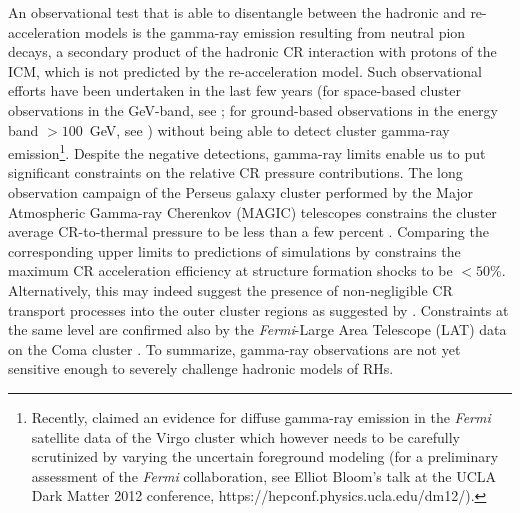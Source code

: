 \documentclass[traditabstract]{aa}
\begin{document}
An observational test that is able to disentangle between the hadronic and
re-acceleration models is the gamma-ray emission resulting from neutral pion
decays, a secondary product of the hadronic CR interaction with protons of the
ICM, which is not predicted by the re-acceleration model. Such observational
efforts have been undertaken in the last few years (for space-based cluster
observations in the GeV-band, see \citealt{2003ApJ...588..155R,
  2010ApJ...717L..71A, 2010JCAP...05..025A, 2012AAS...21920701Z,
  2012arXiv1201.1003H}; for ground-based observations in the energy band
$>100$~GeV, see \citealt{2006ApJ...644..148P, 2008AIPC.1085..569P,
  2009A&A...495...27A, 2009arXiv0907.0727T, 2009arXiv0907.3001D,
  2009arXiv0907.5000G, cangaroo_clusters, 2009ApJ...706L.275A,
  2010ApJ...710..634A, 2011arXiv1111.5544M}) without being able to detect
cluster gamma-ray emission\footnote{Recently, \cite{2012arXiv1201.1003H}
  claimed an evidence for diffuse gamma-ray emission in the \emph{Fermi}
  satellite data of the Virgo cluster which however needs to be carefully
  scrutinized by varying the uncertain foreground modeling (for a preliminary
  assessment of the \emph{Fermi} collaboration, see Elliot Bloom's talk at the
  UCLA Dark Matter 2012 conference, https://hepconf.physics.ucla.edu/dm12/).}.
Despite the negative detections, gamma-ray limits enable us to put significant
constraints on the relative CR pressure contributions. The long observation
campaign of the Perseus galaxy cluster performed by the Major Atmospheric
Gamma-ray Cherenkov (MAGIC) telescopes constrains the cluster average
CR-to-thermal pressure to be less than a few percent
\citep{2010ApJ...710..634A,2011arXiv1111.5544M}. Comparing the corresponding
upper limits to predictions of simulations by \cite{2010MNRAS.409..449P}
constrains the maximum CR acceleration efficiency at structure formation shocks
to be $<50\%$.  Alternatively, this may indeed suggest the presence of
non-negligible CR transport processes into the outer cluster regions as
suggested by \cite{2011A&A...527A..99E}.  Constraints at the same level are
confirmed also by the \emph{Fermi}-Large Area Telescope (LAT) data on the Coma
cluster \citep{2011arXiv1105.3240P, 2012AAS...21920701Z,
  2012arXiv1201.1003H}. To summarize, gamma-ray observations are not yet
sensitive enough to severely challenge hadronic models of RHs.
\end{document}
